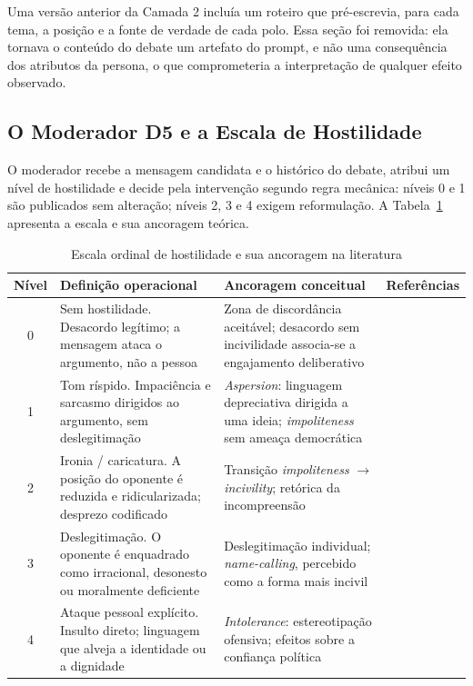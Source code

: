 \documentclass[conference]{IEEEtran} \IEEEoverridecommandlockouts %
\begin{document}
Uma versão anterior da Camada 2 incluía um roteiro que pré-escrevia, para cada
tema, a posição e a fonte de verdade de cada polo. Essa seção foi removida: ela
tornava o conteúdo do debate um artefato do prompt, e não uma consequência dos
atributos da persona, o que comprometeria a interpretação de qualquer efeito
observado.

\subsection{O Moderador D5 e a Escala de Hostilidade}

O moderador recebe a mensagem candidata e o histórico do debate, atribui um
nível de hostilidade e decide pela intervenção segundo regra mecânica: níveis 0
e 1 são publicados sem alteração; níveis 2, 3 e 4 exigem reformulação. A
Tabela~\ref{tab:escala} apresenta a escala e sua ancoragem teórica.

\begin{table}[htbp]
\caption{Escala ordinal de hostilidade e sua ancoragem na literatura}
\begin{center}
\begin{tabularx}{\textwidth}{@{}c>{\raggedright\arraybackslash}X>{\raggedright\arraybackslash}Xl@{}}
\toprule
\textbf{Nível} & \textbf{Definição operacional} & \textbf{Ancoragem conceitual} & \textbf{Referências} \\
\midrule
0 & Sem hostilidade. Desacordo legítimo; a mensagem ataca o argumento, não a
    pessoa & Zona de discordância aceitável; desacordo sem incivilidade
    associa-se a engajamento deliberativo &
    \cite{papacharissi2004democracy,rossini2022beyond} \\
1 & Tom ríspido. Impaciência e sarcasmo dirigidos ao argumento, sem
    deslegitimação & \textit{Aspersion}: linguagem depreciativa dirigida a uma
    ideia; \textit{impoliteness} sem ameaça democrática &
    \cite{coe2014online,papacharissi2004democracy} \\
2 & Ironia / caricatura. A posição do oponente é reduzida e ridicularizada;
    desprezo codificado & Transição \textit{impoliteness} $\rightarrow$
    \textit{incivility}; retórica da incompreensão &
    \cite{rossini2022beyond,angenot2008dialogues,coe2014online} \\
3 & Deslegitimação. O oponente é enquadrado como irracional, desonesto ou
    moralmente deficiente & Deslegitimação individual; \textit{name-calling},
    percebido como a forma mais incivil &
    \cite{bentivegna2022searching,coe2014online,kenski2020perceptions} \\
4 & Ataque pessoal explícito. Insulto direto; linguagem que alveja a
    identidade ou a dignidade & \textit{Intolerance}: estereotipação ofensiva;
    efeitos sobre a confiança política &
    \cite{rossini2022beyond,kenski2020perceptions,mutz2005new} \\
\bottomrule
\end{tabularx}
\label{tab:escala}
\end{center}
\end{table}
\end{document}
